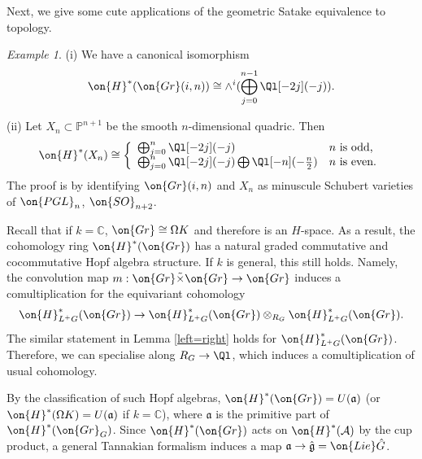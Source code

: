 \documentclass[]{pcmi}
\theoremstyle{plain}
\theoremstyle{remark}
\newtheorem{ex}[equation]{Example}
\theoremstyle{definition}
\newcommand{\fraka}{{\mathfrak a}}
\newcommand{\frakg}{{\mathfrak g}}
\newcommand{\bC}{{\mathbb C}}
\newcommand{\bP}{{\mathbb P}}
\newcommand{\mA}{{\mathcal A}}
\newcommand{\Gr}{{\on{Gr}}}
\newcommand{\Lie}{{\on{Lie}}}
\begin{document}
Next, we give some cute applications of the geometric Satake equivalence to topology.

\begin{ex}(i) We have a canonical isomorphism 
$$\on{H}^*(\Gr(i,n))\cong \wedge^i (\bigoplus_{j=0}^{n-1}\Ql[-2j](-j)).$$

(ii) Let $X_n\subset \bP^{n+1}$ be the smooth $n$-dimensional quadric. Then
\[
\on{H}^*(X_n)\cong\left\{\begin{array}{ll}
\bigoplus_{j=0}^n \Ql[-2j](-j) &  n \mbox{ is odd,} \\ 
\bigoplus_{j=0}^n \Ql[-2j](-j)\bigoplus \Ql[-n](-\frac{n}{2}) &  n \mbox{ is even.}
\end{array}\right.
\] 
The proof is by identifying $\Gr(i,n)$ and $X_n$ as minuscule Schubert varieties of $\on{PGL}_n$, $\on{SO}_{n+2}$.
\end{ex}



Recall that if $k=\bC$, $\Gr\cong \Omega K$ and therefore is an $H$-space. As a result, the cohomology ring $\on{H}^*(\Gr)$ has a natural graded commutative and cocommutative Hopf algebra structure. If $k$ is general, this still holds. Namely, the convolution map $m:\Gr\tilde\times \Gr\to \Gr$ induces a comultiplication for the equivariant cohomology
\[\on{H}^*_{L^+G}(\Gr)\to \on{H}^*_{L^+G}(\Gr)\otimes_{R_G}\on{H}^*_{L^+G}(\Gr).\]
The similar statement in Lemma \ref{left=right} holds for $\on{H}^*_{L^+G}(\Gr)$. Therefore, we can specialise along $R_G\to\Ql$, which induces
a comultiplication of usual cohomology. 

By the classification of such Hopf algebras, $\on{H}^*(\Gr)=U(\fraka)$ (or $\on{H}^*(\Omega K)=U(\fraka)$ if $k=\bC$), where $\fraka$ is the primitive part of $\on{H}^*(\Gr_G)$. Since $\on{H}^*(\Gr)$ acts on $\on{H}^*(\mA)$ by the cup product, a general Tannakian formalism induces a map
$\fraka\to \hat \frakg=\Lie \hat G$. 
\end{document}

